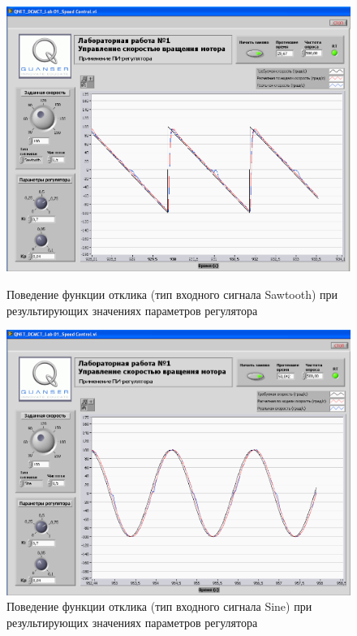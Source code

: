 \documentclass[12pt]{article}
\begin{document}
\vfill
\begin{center}
	\begin{figure}
		\centering
		\includegraphics[scale=1.6]{control_sawtooth}
		\caption{Поведение функции отклика (тип входного сигнала Sawtooth) при результирующих значениях параметров регулятора}
		\hfill\break
		\centering
		\includegraphics[scale=1.6]{control_sine}
		\caption{Поведение функции отклика (тип входного сигнала Sine) при результирующих значениях параметров регулятора}
	\end{figure}
\end{center}
\vfill
\newpage
\end{document}
